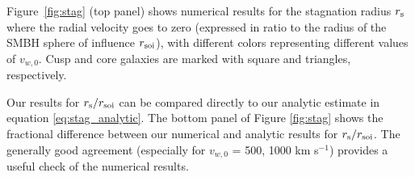 \documentclass[usenatbib,fleqn]{mn2e}
\begin{document}
Figure~\ref{fig:stag} (top panel) shows numerical results for the stagnation radius $r_{\rm s}$ where the radial velocity goes to zero (expressed in ratio to the radius of the SMBH sphere of influence $r_{\rm soi}$), with different colors representing different values of $v_{w,0}$.  Cusp and core galaxies are marked with square and triangles, respectively.  

Our results for $r_{\rm s}/r_{\rm soi}$ can be compared directly to our analytic estimate in equation \ref{eq:stag_analytic}.  The bottom panel of Figure \ref{fig:stag} shows the fractional difference between our numerical and analytic results for $r_{\rm s}/r_{\rm soi}$.  The generally good agreement (especially for $v_{w,0}$ = 500, 1000 km s$^{-1}$) provides a useful check of the numerical results.

\end{document}
